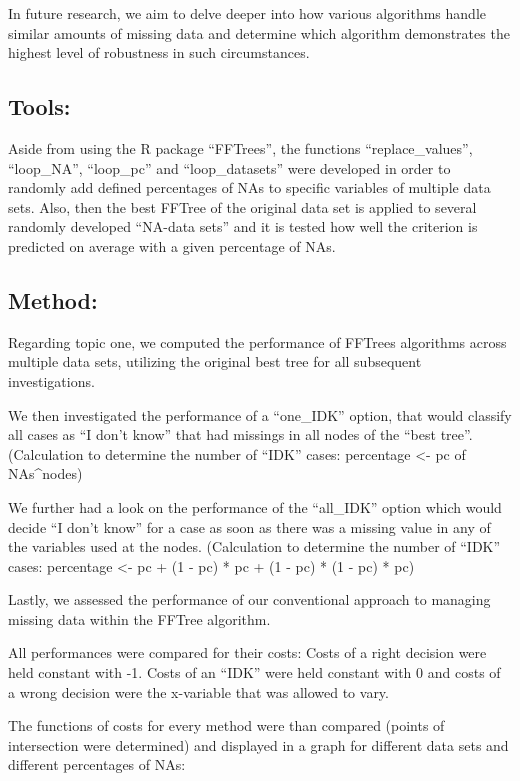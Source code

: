 \documentclass[
]{article}
\begin{document}
In future research, we aim to delve deeper into how various algorithms
handle similar amounts of missing data and determine which algorithm
demonstrates the highest level of robustness in such circumstances.

\hypertarget{tools}{%
\subsection{Tools:}\label{tools}}

Aside from using the R package ``FFTrees'', the functions
``replace\_values'', ``loop\_NA'', ``loop\_pc'' and ``loop\_datasets''
were developed in order to randomly add defined percentages of NAs to
specific variables of multiple data sets. Also, then the best FFTree of
the original data set is applied to several randomly developed ``NA-data
sets'' and it is tested how well the criterion is predicted on average
with a given percentage of NAs.

\hypertarget{method}{%
\subsection{Method:}\label{method}}

Regarding topic one, we computed the performance of FFTrees algorithms
across multiple data sets, utilizing the original best tree for all
subsequent investigations.

We then investigated the performance of a ``one\_IDK'' option, that
would classify all cases as ``I don't know'' that had missings in all
nodes of the ``best tree''. (Calculation to determine the number of
``IDK'' cases: percentage \textless- pc of NAs\^{}nodes)

We further had a look on the performance of the ``all\_IDK'' option
which would decide ``I don't know'' for a case as soon as there was a
missing value in any of the variables used at the nodes. (Calculation to
determine the number of ``IDK'' cases: percentage \textless- pc + (1 -
pc) * pc + (1 - pc) * (1 - pc) * pc)

Lastly, we assessed the performance of our conventional approach to
managing missing data within the FFTree algorithm.

All performances were compared for their costs: Costs of a right
decision were held constant with -1. Costs of an ``IDK'' were held
constant with 0 and costs of a wrong decision were the x-variable that
was allowed to vary.

The functions of costs for every method were than compared (points of
intersection were determined) and displayed in a graph for different
data sets and different percentages of NAs:
\end{document}
